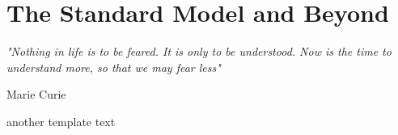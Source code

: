\chapter{The Standard Model and Beyond}
\label{ch:theory}
\epigraph{\emph{"Nothing in life is to be feared. It is only to be understood. Now is the time to understand more, so that we may fear less"}}{Marie Curie}

another template text



